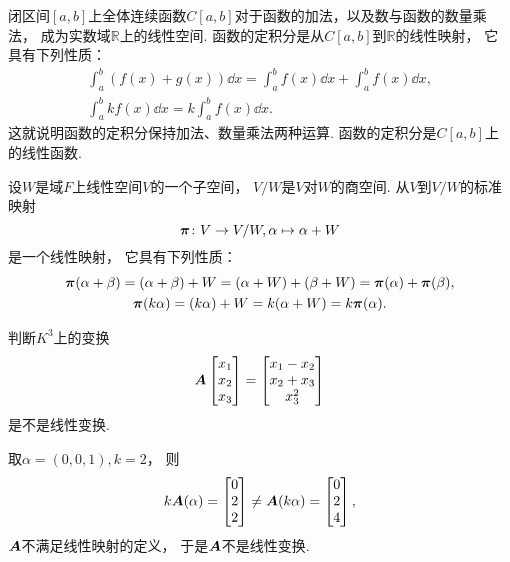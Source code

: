 \begin{example}\label{example:线性映射.给定区间上的定积分是线性函数}
闭区间\([a,b]\)上全体连续函数\(C[a,b]\)对于函数的加法，以及数与函数的数量乘法，
成为实数域\(\mathbb{R}\)上的线性空间.
函数的定积分是从\(C[a,b]\)到\(\mathbb{R}\)的线性映射，
它具有下列性质：\begin{gather*}
	\int_a^b (f(x) + g(x)) \dd{x}
	= \int_a^b f(x) \dd{x} + \int_a^b f(x) \dd{x}, \\
	\int_a^b k f(x) \dd{x}
	= k \int_a^b f(x) \dd{x}.
\end{gather*}
这就说明函数的定积分保持加法、数量乘法两种运算.
函数的定积分是\(C[a,b]\)上的线性函数.
\end{example}

\begin{example}
设\(W\)是域\(F\)上线性空间\(V\)的一个子空间，
\(V/W\)是\(V\)对\(W\)的商空间.
从\(V\)到\(V/W\)的标准映射\begin{equation*}
	\boldsymbol\pi\colon V \to V/W,
	\alpha \mapsto \alpha+W
\end{equation*}是一个线性映射，
它具有下列性质：\begin{gather*}
	\boldsymbol\pi(\alpha+\beta)
	= (\alpha+\beta)+W
	= (\alpha+W) + (\beta+W)
	= \boldsymbol\pi(\alpha) + \boldsymbol\pi(\beta), \\
	\boldsymbol\pi(k\alpha)
	= (k\alpha)+W
	= k(\alpha+W)
	= k\boldsymbol\pi(\alpha).
\end{gather*}
\end{example}

\begin{example}
判断\(K^3\)上的变换\begin{equation*}
	\boldsymbol{A}
	\begin{bmatrix}
		x_1 \\ x_2 \\ x_3
	\end{bmatrix}
	= \begin{bmatrix}
		x_1 - x_2 \\
		x_2 + x_3 \\
		x_3^2
	\end{bmatrix}
\end{equation*}是不是线性变换.
\begin{solution}
取\(\alpha=(0,0,1),
k=2\)，
则\begin{equation*}
	k\boldsymbol{A}(\alpha)
	= \begin{bmatrix}
		0 \\ 2 \\ 2
	\end{bmatrix}
	\neq
	\boldsymbol{A}(k\alpha)
	= \begin{bmatrix}
		0 \\ 2 \\ 4
	\end{bmatrix},
\end{equation*}
\(\boldsymbol{A}\)不满足线性映射的定义，
于是\(\boldsymbol{A}\)不是线性变换.
\end{solution}
\end{example}

